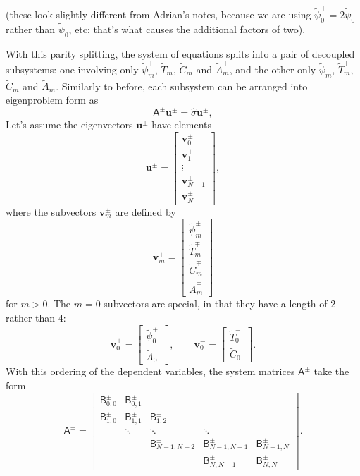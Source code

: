 \documentclass{article}
\newcommand{\shat}{\hat{\sigma}}
\newcommand{\ptil}{\tilde{\psi}}
\newcommand{\Ttil}{\tilde{T}}
\newcommand{\Ctil}{\tilde{C}}
\newcommand{\Atil}{\tilde{A}}
\newcommand{\Amat}{\boldsymbol{\mathsf{A}}}
\newcommand{\Bmat}{\boldsymbol{\mathsf{B}}}
\newcommand{\uvec}{\mathbf{u}}
\newcommand{\vvec}{\mathbf{v}}
\begin{document}
%
(these look slightly different from Adrian's notes, because we are
using $\ptil_{0}^{+} = 2 \ptil_{0}$ rather than $\ptil_{0}$, etc;
that's what causes the additional factors of two).

With this parity splitting, the system of equations splits into a pair
of decoupled subsystems: one involving only $\ptil_m^+$, $\Ttil_m^-$,
$\Ctil_m^-$ and $\Atil_m^+$, and the other only $\ptil_m^-$,
$\Ttil_m^+$, $\Ctil_m^+$ and $\Atil_m^-$. Similarly to before, each
subsystem can be arranged into eigenproblem form as
%
\begin{equation}
  \Amat^{\pm} \uvec^{\pm} = \shat \uvec^{\pm},
\end{equation}
%
Let's assume the eigenvectors $\uvec^{\pm}$ have elements
%
\begin{equation}
  \uvec^{\pm} =
  \begin{bmatrix}
    \vvec_{0}^{\pm} \\
    \vvec_{1}^{\pm} \\
    \vdots \\
    \vvec_{N-1}^{\pm} \\
    \vvec_{N}^{\pm}
  \end{bmatrix},
\end{equation}
%
where the subvectors $\vvec_{m}^{\pm}$ are defined by
%
\begin{equation}
  \vvec_{m}^{\pm} =
  \begin{bmatrix}
    \ptil_{m}^{\pm} \\
    \Ttil_{m}^{\mp} \\
    \Ctil_{m}^{\mp} \\
    \Atil_{m}^{\pm}
  \end{bmatrix}
\end{equation}
%
for $m > 0$. The $m = 0$ subvectors are special, in that they have a length of 2 rather than 4:
%
\begin{equation}
  \vvec_{0}^{+} =
  \begin{bmatrix}
    \ptil_{0}^{+} \\
    \Atil_{0}^{+}
  \end{bmatrix},
  \qquad
  \vvec_{0}^{-} =
  \begin{bmatrix}
    \Ttil_{0}^{-} \\
    \Ctil_{0}^{-}
  \end{bmatrix}.
\end{equation}
%
With this ordering of the dependent variables, the system matrices $\Amat^{\pm}$ take the form
%
\begin{equation}
  \Amat^{\pm} =
  \begin{bmatrix}
    \Bmat_{0,0}^{\pm} & \Bmat_{0,1}^{\pm} & & & \\
    \Bmat_{1,0}^{\pm} & \Bmat_{1,1}^{\pm} & \Bmat_{1,2}^{\pm} & & \\
    & \ddots & \ddots & \ddots & \\
    & & \Bmat_{N-1,N-2}^{\pm} & \Bmat_{N-1,N-1}^{\pm} & \Bmat_{N-1,N}^{\pm} \\
    & & & \Bmat_{N,N-1}^{\pm} & \Bmat_{N,N}^{\pm}
  \end{bmatrix}.
\end{equation}
\end{document}
